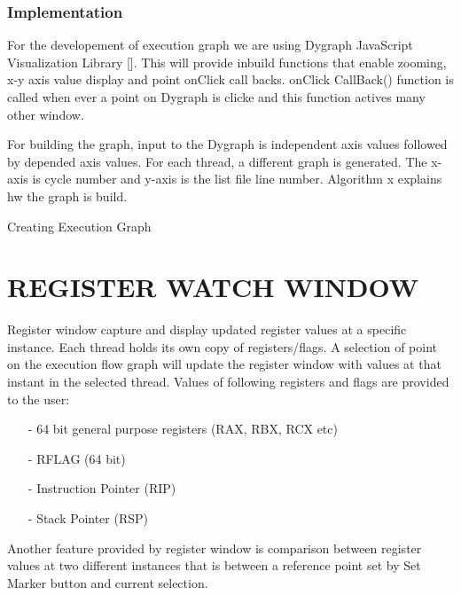 \subsubsection {Implementation}

For the developement of execution graph we are using Dygraph JavaScript Visualization Library []. This will provide inbuild functions that enable zooming, x-y axis value display and point onClick call backs. onClick CallBack() function is called when ever a point on Dygraph is clicke and this function actives many other window.

For building the graph, input to the Dygraph is independent axis values followed by depended axis values. For each thread, a different graph is generated. The x-axis is cycle number and y-axis is the list file line number. Algorithm x explains hw the graph is build.

\IncMargin{1em}
\begin{algorithm}[H]
\DontPrintSemicolon
{} 
\KwFn{}
\BlankLine
{}
\caption{Creating Execution Graph}
\end{algorithm}\DecMargin{1em}

\section {REGISTER WATCH WINDOW}

Register window capture and display updated register values at a specific instance. Each thread holds its own copy of registers/flags. A selection of point on the execution flow graph will update the register window with values at that instant in the selected thread. Values of following registers and flags are provided to the user:
\begin{itemize}
	\item[-] 64 bit general purpose registers (RAX, RBX, RCX etc)
	\item[-] RFLAG (64 bit)
	\item[-] Instruction Pointer (RIP)
	\item[-] Stack Pointer (RSP)
\end{itemize}

Another feature provided by register window is comparison between register values at two different instances that is between a reference point set by Set Marker button and current selection. 

